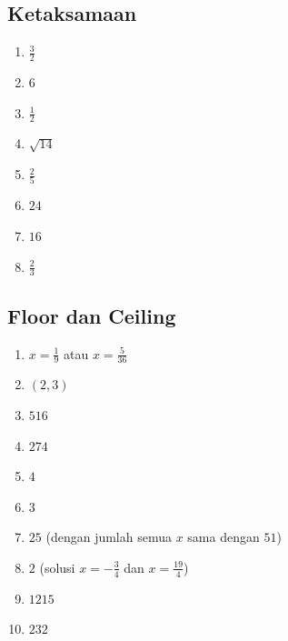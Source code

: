 \documentclass[12pt]{scrartcl}
\begin{document}
\subsection{Ketaksamaan}
\begin{enumerate}
\item $\frac{3}{2}$
\item $6$
\item $\frac{1}{2}$
\item $\sqrt{14}$
\item $\frac{2}{5}$
\item $24$
\item $16$
\item $\frac{2}{3}$
\end{enumerate}
\subsection{Floor dan Ceiling}
\begin{enumerate}
\item $x=\frac{1}{9}$ atau $x=\frac{5}{36}$
\item $(2,3)$
\item $516$
\item $274$
\item $4$
\item $3$
\item $25$ (dengan jumlah semua $x$ sama dengan $51$)
\item $2$ (solusi $x=-\frac34$ dan $x=\frac{19}4$)
\item $1215$
\item $232$
\end{enumerate}
\end{document}
